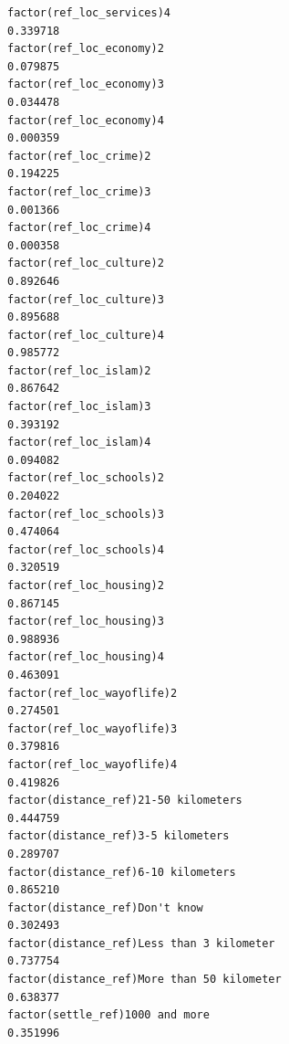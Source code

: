 \documentclass[
]{article}
\begin{document}
\begin{table}
\begin{minipage}[t]{\linewidth}
{\begin{verbatim}
factor(ref_loc_services)4                                                         0.339718
factor(ref_loc_economy)2                                                          0.079875
factor(ref_loc_economy)3                                                          0.034478
factor(ref_loc_economy)4                                                          0.000359
factor(ref_loc_crime)2                                                            0.194225
factor(ref_loc_crime)3                                                            0.001366
factor(ref_loc_crime)4                                                            0.000358
factor(ref_loc_culture)2                                                          0.892646
factor(ref_loc_culture)3                                                          0.895688
factor(ref_loc_culture)4                                                          0.985772
factor(ref_loc_islam)2                                                            0.867642
factor(ref_loc_islam)3                                                            0.393192
factor(ref_loc_islam)4                                                            0.094082
factor(ref_loc_schools)2                                                          0.204022
factor(ref_loc_schools)3                                                          0.474064
factor(ref_loc_schools)4                                                          0.320519
factor(ref_loc_housing)2                                                          0.867145
factor(ref_loc_housing)3                                                          0.988936
factor(ref_loc_housing)4                                                          0.463091
factor(ref_loc_wayoflife)2                                                        0.274501
factor(ref_loc_wayoflife)3                                                        0.379816
factor(ref_loc_wayoflife)4                                                        0.419826
factor(distance_ref)21-50 kilometers                                              0.444759
factor(distance_ref)3-5 kilometers                                                0.289707
factor(distance_ref)6-10 kilometers                                               0.865210
factor(distance_ref)Don't know                                                    0.302493
factor(distance_ref)Less than 3 kilometer                                         0.737754
factor(distance_ref)More than 50 kilometer                                        0.638377
factor(settle_ref)1000 and more                                                   0.351996

\end{verbatim}}
\end{minipage}
\end{table}
\end{document}

